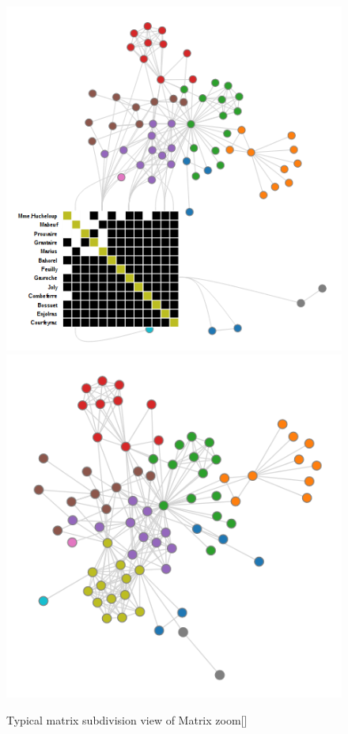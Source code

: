 \begin{figure}[h]
\centering
\includegraphics[width=\textwidth/3]{images/nodetrix_cluster}
\includegraphics[width=\textwidth/3]{images/nodetrix_matrix}
\caption{Typical matrix subdivision view of Matrix zoom[\cite{henry-nodetrix-2007}] \label{fig:nodetrix_cluster}}
\end{figure}
